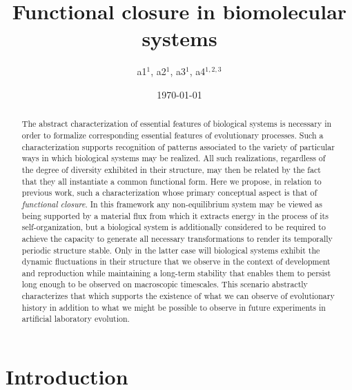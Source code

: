 \documentclass[aps,twocolumn]{revtex4-1}
\begin{document}
 

\title{\bf Functional closure in biomolecular systems}

\author{a1$^{1}$, a2$^{1}$, a3$^{1}$, a4$^{1,2,3}$}


\date{\today}
\begin{abstract}
The abstract characterization of essential features of biological systems is necessary in order to formalize corresponding essential features of evolutionary processes. Such a characterization supports recognition of patterns associated to the variety of particular ways in which biological systems may be realized. All such realizations, regardless of the degree of diversity exhibited in their structure, may then be related by the fact that they all instantiate a common functional form. Here we propose, in relation to previous work, such a characterization whose primary conceptual aspect is that of {\it functional closure}. In this framework any non-equilibrium system may be viewed as being supported by a material flux from which it extracts energy in the process of its self-organization, but a biological system is additionally considered to be required to achieve the capacity to generate all necessary transformations to render its temporally periodic structure stable. Only in the latter case will biological systems exhibit the dynamic fluctuations in their structure that we observe in the context of development and reproduction while maintaining a long-term stability that enables them to persist long enough to be observed on macroscopic timescales. This scenario abstractly characterizes that which supports the existence of what we can observe of evolutionary history in addition to what we might be possible to observe in future experiments in artificial laboratory evolution.
\end{abstract}

\maketitle

\tableofcontents

\section{Introduction}
\end{document}
